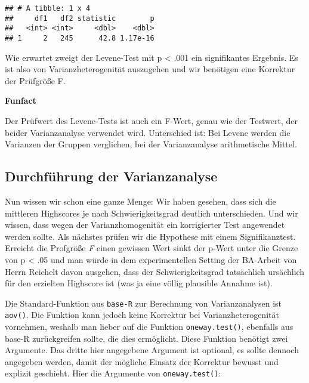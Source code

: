 \documentclass[
]{book}
\begin{document}
\begin{verbatim}
## # A tibble: 1 x 4
##     df1   df2 statistic        p
##   <int> <int>     <dbl>    <dbl>
## 1     2   245      42.8 1.17e-16
\end{verbatim}

Wie erwartet zweigt der Levene-Test mit p \textless{} .001 ein signifikantes Ergebnis. Es ist also von Varianzheterogenität auszugehen und wir benötigen eine Korrektur der Prüfgröße F.

\leavevmode\hypertarget{info_levenef}{}%
\textbf{Funfact}

Der Prüfwert des Levene-Tests ist auch ein F-Wert, genau wie der Testwert, der beider Varianzanalyse verwendet wird. Unterschied ist: Bei Levene werden die Varianzen der Gruppen verglichen, bei der Varianzanalyse arithmetische Mittel.

\hypertarget{durchfuxfchrung-der-varianzanalyse}{%
\subsection{Durchführung der Varianzanalyse}\label{durchfuxfchrung-der-varianzanalyse}}

Nun wissen wir schon eine ganze Menge: Wir haben gesehen, dass sich die mittleren Highscores je nach Schwierigkeitsgrad deutlich unterschieden. Und wir wissen, dass wegen der Varianzhomogenität ein korrigierter Test angewendet werden sollte. Als nächstes prüfen wir die Hypothese mit einem Signifikanztest. Erreicht die Profgröße \emph{F} einen gewissen Wert sinkt der p-Wert unter die Grenze von p \textless{} .05 und man würde in dem experimentellen Setting der BA-Arbeit von Herrn Reichelt davon ausgehen, dass der Schwierigkeitsgrad tatsächlich ursächlich für den erzielten Highscore ist (was ja eine völlig plausible Annahme ist).

Die Standard-Funktion aus \texttt{base-R} zur Berechnung von Varianzanalysen ist \texttt{aov()}. Die Funktion kann jedoch keine Korrektur bei Varianzheterogenität vornehmen, weshalb man lieber auf die Funktion \texttt{oneway.test()}, ebenfalls aus base-R zurückgreifen sollte, die dies ermöglicht. Diese Funktion benötigt zwei Argumente. Das dritte hier angegebene Argument ist optional, es sollte dennoch angegeben werden, damit der mögliche Einsatz der Korrektur bewusst und explizit geschieht. Hier die Argumente von \texttt{oneway.test()}:
\end{document}
